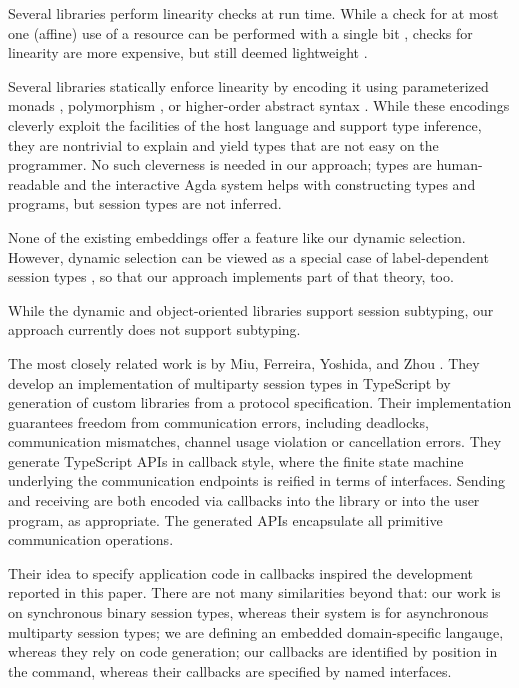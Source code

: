 \documentclass[acmsmall,review,anonymous,screen]{acmart}
\begin{document}
Several libraries perform
linearity checks at run time. While a check for at most one (affine)
use of a resource can be performed with a single bit
\cite{DBLP:conf/esop/TovP10},  checks for linearity are more
expensive, but still deemed lightweight
\cite{DBLP:conf/fase/HuY16}.

Several libraries statically enforce linearity by encoding it
using parameterized monads
\cite{SackmanE08,DBLP:conf/haskell/PucellaT08},  polymorphism
\cite{DBLP:journals/scp/ImaiYY19}, or higher-order 
abstract syntax \cite{DBLP:conf/haskell/LindleyM16}. While these
encodings cleverly exploit the facilities of the host language and
support type inference, they
are nontrivial to explain and yield types that are not easy on the
programmer. No such cleverness is needed in our approach; types are
human-readable and the interactive Agda system helps with constructing
types and programs, but session types are not inferred.

None of the existing embeddings offer a feature like our dynamic
selection. However, dynamic selection can be viewed as a special case
of label-dependent session types
\cite{DBLP:journals/pacmpl/ThiemannV20}, so that our  approach
implements part of that theory, too.

While the dynamic and object-oriented libraries support session
subtyping, our approach currently does not support subtyping. 


The most closely related work is by Miu, Ferreira, Yoshida, and Zhou
\cite{DBLP:conf/cc/Miu0Y021}. They develop an
implementation of multiparty session types in TypeScript by generation
of custom libraries from a protocol specification. Their
implementation guarantees freedom from
communication errors, including deadlocks, communication
mismatches, channel usage violation or cancellation errors. They
generate TypeScript APIs in callback style, where the finite state
machine underlying the communication endpoints is reified in terms of
interfaces. Sending and receiving are both encoded via callbacks 
into the library or into the user program, as appropriate. The
generated APIs encapsulate all primitive communication operations.

Their idea to specify application code in callbacks inspired the
development reported in this paper. There are not many similarities
beyond that: our work is on synchronous binary session types, whereas
their system is for asynchronous multiparty session types; we are
defining an embedded domain-specific langauge, whereas they rely on
code generation; our callbacks are identified by position in the
command, whereas their callbacks are specified by named interfaces.
\end{document}
